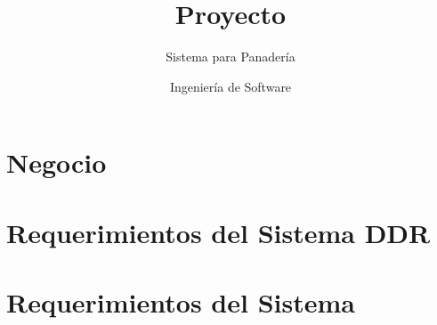 \documentclass[oneside,10pt]{book}
\title{Proyecto}
\subtitle{Sistema para Panadería}
\author{Ingeniería de Software}
\begin{document}
\maketitle
\thispagestyle{empty}

\frontmatter
\tableofcontents

\mainmatter

\chapter{Negocio}


\chapter{Requerimientos del Sistema DDR}
\chapter{Requerimientos del Sistema}
	
	

\end{document}
